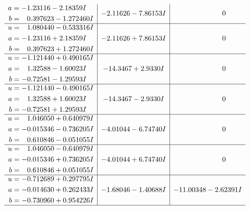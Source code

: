 \documentclass[1p]{elsarticle_modified}
\theoremstyle{definition}
\begin{document}
$$\begin{array}{c|c|c}
\begin{aligned}
a &= -1.23116 - 2.18359 I \\
b &= \phantom{-}0.397623 - 1.272460 I\end{aligned}
 & -2.11626 - 7.86153 I & \phantom{-0.000000 } 0 \\ \hline\begin{aligned}
u &= \phantom{-}1.080440 - 0.533316 I \\
a &= -1.23116 + 2.18359 I \\
b &= \phantom{-}0.397623 + 1.272460 I\end{aligned}
 & -2.11626 + 7.86153 I & \phantom{-0.000000 } 0 \\ \hline\begin{aligned}
u &= -1.121440 + 0.490165 I \\
a &= \phantom{-}1.32588 - 1.60023 I \\
b &= -0.72581 - 1.29593 I\end{aligned}
 & -14.3467 + 2.9330 I & \phantom{-0.000000 } 0 \\ \hline\begin{aligned}
u &= -1.121440 - 0.490165 I \\
a &= \phantom{-}1.32588 + 1.60023 I \\
b &= -0.72581 + 1.29593 I\end{aligned}
 & -14.3467 - 2.9330 I & \phantom{-0.000000 } 0 \\ \hline\begin{aligned}
u &= \phantom{-}1.046050 + 0.640979 I \\
a &= -0.015346 - 0.736205 I \\
b &= \phantom{-}0.610846 - 0.051055 I\end{aligned}
 & -4.01044 - 6.74740 I & \phantom{-0.000000 } 0 \\ \hline\begin{aligned}
u &= \phantom{-}1.046050 - 0.640979 I \\
a &= -0.015346 + 0.736205 I \\
b &= \phantom{-}0.610846 + 0.051055 I\end{aligned}
 & -4.01044 + 6.74740 I & \phantom{-0.000000 } 0 \\ \hline\begin{aligned}
u &= -0.712689 + 0.297795 I \\
a &= -0.014630 + 0.262433 I \\
b &= -0.730960 + 0.954226 I\end{aligned}
 & -1.68046 - 1.40688 I & -11.00348 - 2.62391 I\\
 \hline 
 \end{array}$$\newpage$$\begin{array}{c|c|c}  

\end{array}$$
\end{document}

